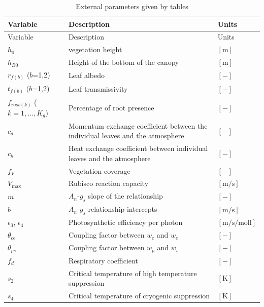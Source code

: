 \begin{landscape}

\begin{longtable}[]{@{}lll@{}}
\caption{External parameters given by tables}\tabularnewline
\toprule\noalign{}
Variable & Description & Units \\
\midrule\noalign{}
\endfirsthead
\toprule\noalign{}
Variable & Description & Units \\
\midrule\noalign{}
\endhead
\bottomrule\noalign{}
\endlastfoot
\(h_0\) & vegetation height & \(\mathrm{[m]}\) \\
\(h_{B0}\) & Height of the bottom of the canopy & \(\mathrm{[m]}\) \\
\(r_{f(b)}\) (\(b\)=1,2) & Leaf albedo & \(\mathrm{[-]}\) \\
\(t_{f(b)}\) (\(b\)=1,2) & Leaf transmissivity & \(\mathrm{[-]}\) \\
\(f_{root(k)}\) (\(k=1,\ldots,K_g\)) & Percentage of root presence & \(\mathrm{[-]}\) \\
\(c_d\) & Momentum exchange coefficient between the individual leaves and the atmosphere & \(\mathrm{[-]}\) \\
\(c_h\) & Heat exchange coefficient between individual leaves and the atmosphere & \(\mathrm{[-]}\) \\
\(f_V\) & Vegetation coverage & \(\mathrm{[-]}\) \\
\(V_{\max}\) & Rubisco reaction capacity & \(\mathrm{[m/s]}\) \\
\(m\) & \(A_n\)-\(g_s\) slope of the relationship & \(\mathrm{[-]}\) \\
\(b\) & \(A_n\)-\(g_s\) relationship intercepts & \(\mathrm{[m/s]}\) \\
\(\epsilon_3\), \(\epsilon_4\) & Photosynthetic efficiency per photon & \(\mathrm{[m/s/moll]}\) \\
\(\theta_{ce}\) & Coupling factor between \(w_c\) and \(w_e\) & \(\mathrm{[-]}\) \\
\(\theta_{ps}\) & Coupling factor between \(w_p\) and \(w_s\) & \(\mathrm{[-]}\) \\
\(f_d\) & Respiratory coefficient & \(\mathrm{[-]}\) \\
\(s_2\) & Critical temperature of high temperature suppression & \(\mathrm{[K]}\) \\
\(s_4\) & Critical temperature of cryogenic suppression & \(\mathrm{[K]}\) \\
\end{longtable}

\end{landscape}

